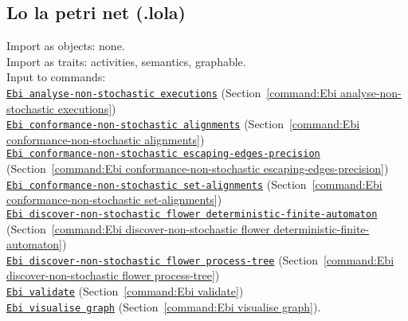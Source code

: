 {\subsection{Lo la petri net (.lola)}
\label{filehandler:LoLa Petri net}
Import as objects: none.
\\Import as traits: activities, semantics, graphable.
\\Input to commands: \\\null\qquad\hyperref[command:Ebi analyse-non-stochastic executions]{\texttt{Ebi analyse-non-stochastic executions}} (Section~\ref{command:Ebi analyse-non-stochastic executions})\\\null\qquad\hyperref[command:Ebi conformance-non-stochastic alignments]{\texttt{Ebi conformance-non-stochastic alignments}} (Section~\ref{command:Ebi conformance-non-stochastic alignments})\\\null\qquad\hyperref[command:Ebi conformance-non-stochastic escaping-edges-precision]{\texttt{Ebi conformance-non-stochastic escaping-edges-precision}} (Section~\ref{command:Ebi conformance-non-stochastic escaping-edges-precision})\\\null\qquad\hyperref[command:Ebi conformance-non-stochastic set-alignments]{\texttt{Ebi conformance-non-stochastic set-alignments}} (Section~\ref{command:Ebi conformance-non-stochastic set-alignments})\\\null\qquad\hyperref[command:Ebi discover-non-stochastic flower deterministic-finite-automaton]{\texttt{Ebi discover-non-stochastic flower deterministic-finite-automaton}} (Section~\ref{command:Ebi discover-non-stochastic flower deterministic-finite-automaton})\\\null\qquad\hyperref[command:Ebi discover-non-stochastic flower process-tree]{\texttt{Ebi discover-non-stochastic flower process-tree}} (Section~\ref{command:Ebi discover-non-stochastic flower process-tree})\\\null\qquad\hyperref[command:Ebi validate]{\texttt{Ebi validate}} (Section~\ref{command:Ebi validate})\\\null\qquad\hyperref[command:Ebi visualise graph]{\texttt{Ebi visualise graph}} (Section~\ref{command:Ebi visualise graph}).
}
